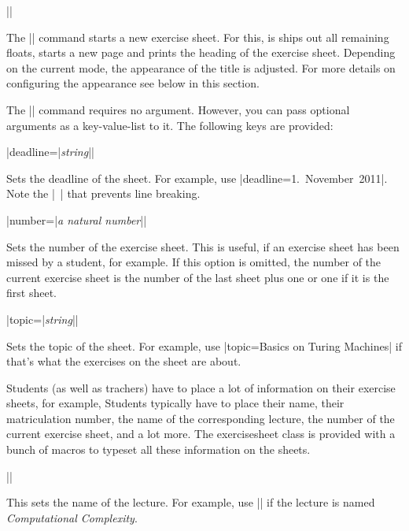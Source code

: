 \documentclass[a4paper,fleqn,9pt]{report}
\def\exercisesheet{{exercisesheet}}
\def\syntaxdefaultarg#1{\hfill\texttt{#1}\par\smallskip\noindent\ignorespaces}
\def\metaargument#1{\textit{#1}}
\begin{document}
\begin{syntax}
  |\sheet[|\metaargument{key-value-list}|]| \syntaxdefaultarg{}
  The |\sheet| command starts a new exercise sheet. For this, is ships
  out all remaining floats, starts a new page and prints the heading
  of the exercise sheet. Depending on the current mode, the appearance
  of the title is adjusted. For more details on configuring the
  appearance see below in this section.

  The |\sheet| command requires no argument. However, you can pass
  optional arguments as a key-value-list to it. The following keys are
  provided:
  \begin{syntax}
    |deadline={|\metaargument{string}|}| \syntaxdefaultarg{}
    Sets the deadline of the sheet. For example, use 
    |deadline={1.~November~2011}|. Note the |~| that prevents line
    breaking.
  \end{syntax}
  \begin{syntax}
    |number={|\metaargument{a natural number}|}| \syntaxdefaultarg{}
    Sets the number of the exercise sheet. This is useful, if an
    exercise sheet has been missed by a student, for example. If this
    option is omitted, the number of the current exercise sheet is the
    number of the last sheet plus one or one if it is the first sheet.
  \end{syntax}
  \begin{syntax}
    |topic={|\metaargument{string}|}| \syntaxdefaultarg{}
    Sets the topic of the sheet. For example, use 
    |topic={Basics on Turing Machines}| if that's what the exercises
    on the sheet are about.
  \end{syntax}
\end{syntax}

Students (as well as trachers) have to place a lot of information
on their exercise sheets, for example, Students typically have to
place their name, their matriculation number, the name of the
corresponding lecture, the number of the current exercise sheet, and a
lot more. The \exercisesheet{} class is provided with a bunch of
macros to typeset all these information on the sheets.

\begin{syntax}
  |\lecture{|\metaargument{string}|}| \syntaxdefaultarg{}
  This sets the name of the lecture. For example, use
  || if the lecture is named
  \emph{Computational Complexity}.
\end{syntax}
\end{document}
